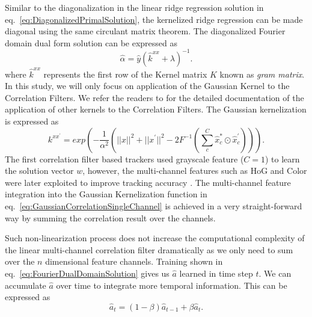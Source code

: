 \documentclass{bmvc2k}
\begin{document}

Similar to the diagonalization in the linear ridge regression
solution in eq.~\ref{eq:DiagonalizedPrimalSolution}, the kernelized
ridge regression can be made diagonal using the same circulant matrix
theorem.  The diagonalized Fourier domain dual form solution can be
expressed as
\begin{equation}
\hat{\alpha} = \hat{y}(\hat{k}^{xx}+\lambda)^{-1}
\label{eq:FourierDualDomainSolution}.
\end{equation}
where $\hat{k}^{xx}$ represents the first row of the Kernel matrix $K$
known as \textit{gram matrix}. In this study, we will only focus on
application of the Gaussian Kernel to the Correlation Filters. We
refer the readers to \cite{henriques2015high} for the detailed
documentation of the application of other kernels to the Correlation
Filters. The Gaussian kernelization is
expressed as
\begin{equation}
k^{xx^{'}} = exp(-\dfrac{1}{\alpha^{2}}(||x||^{2}+||x^{'}||^{2}-2F^{-1}(\sum^{C}_{c}\hat{x}_{c}^{*}\odot \hat{x}_{c}^{'}))).
\label{eq:GaussianCorrelationSingleChannel}
\end{equation}
The first correlation filter based trackers used grayscale feature ($C=1$) to
learn the solution vector $w$, however, the multi-channel features
such as HoG and Color were later exploited to improve tracking
accuracy \cite{henriques2015high,galoogahi2013multi,tang2015multi,ma2015long,bibi2015multi}. The
multi-channel feature integration into the Gaussian Kernelization
function in eq.~\ref{eq:GaussianCorrelationSingleChannel} is achieved
in a very straight-forward way by summing the correlation result over the channels.

Such non-linearization process does not increase the computational
complexity of the linear multi-channel correlation filter dramatically
as we only need to sum over the $n$ dimensional feature
channels. Training shown in eq.~\ref{eq:FourierDualDomainSolution}
gives us $\hat{a}$ learned in time step $t$. We can accumulate
$\hat{a}$ over time to integrate more temporal information. This can
be expressed as
\begin{equation}
\hat{a}_{t} = (1-\beta)\hat{a}_{t-1} + \beta\hat{a}_{t}. 
\end{equation}
\end{document}
